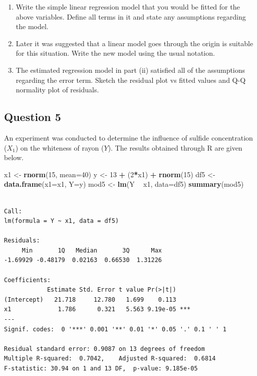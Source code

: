 \documentclass[]{article}
\newenvironment{Shaded}{\begin{snugshade}}{\end{snugshade}}
\newcommand{\DataTypeTok}[1]{\textcolor[rgb]{0.13,0.29,0.53}{#1}}
\newcommand{\DecValTok}[1]{\textcolor[rgb]{0.00,0.00,0.81}{#1}}
\newcommand{\KeywordTok}[1]{\textcolor[rgb]{0.13,0.29,0.53}{\textbf{#1}}}
\newcommand{\NormalTok}[1]{#1}
\newcommand{\OperatorTok}[1]{\textcolor[rgb]{0.81,0.36,0.00}{\textbf{#1}}}
\newcommand{\StringTok}[1]{\textcolor[rgb]{0.31,0.60,0.02}{#1}}
\begin{document}
\begin{enumerate}
\def\labelenumi{\roman{enumi})}
\item
  Write the simple linear regression model that you would be fitted for
  the above variables. Define all terms in it and state any assumptions
  regarding the model.
\item
  Later it was suggested that a linear model goes through the origin is
  suitable for this situation. Write the new model using the usual
  notation.
\item
  The estimated regression model in part (ii) satisfied all of the
  assumptions regarding the error term. Sketch the residual plot vs
  fitted values and Q-Q normality plot of residuals.
\end{enumerate}

\hypertarget{question-5}{%
\subsection{Question 5}\label{question-5}}

An experiment was conducted to determine the influence of sulfide
concentration (\(X_1\)) on the whiteness of rayon (\(Y\)). The results
obtained through R are given below.

\begin{Shaded}
\begin{Highlighting}[]
\NormalTok{x1 <-}\StringTok{ }\KeywordTok{rnorm}\NormalTok{(}\DecValTok{15}\NormalTok{, }\DataTypeTok{mean=}\DecValTok{40}\NormalTok{)}
\NormalTok{y <-}\StringTok{ }\DecValTok{13} \OperatorTok{+}\StringTok{ }\NormalTok{(}\DecValTok{2}\OperatorTok{*}\NormalTok{x1) }\OperatorTok{+}\StringTok{ }\KeywordTok{rnorm}\NormalTok{(}\DecValTok{15}\NormalTok{)}
\NormalTok{df5 <-}\StringTok{ }\KeywordTok{data.frame}\NormalTok{(}\DataTypeTok{x1=}\NormalTok{x1, }\DataTypeTok{Y=}\NormalTok{y)}
\NormalTok{mod5 <-}\StringTok{ }\KeywordTok{lm}\NormalTok{(Y }\OperatorTok{~}\StringTok{ }\NormalTok{x1, }\DataTypeTok{data=}\NormalTok{df5)}
\KeywordTok{summary}\NormalTok{(mod5)}
\end{Highlighting}
\end{Shaded}

\begin{verbatim}

Call:
lm(formula = Y ~ x1, data = df5)

Residuals:
     Min       1Q   Median       3Q      Max 
-1.69929 -0.48179  0.02163  0.66530  1.31226 

Coefficients:
            Estimate Std. Error t value Pr(>|t|)    
(Intercept)   21.718     12.780   1.699    0.113    
x1             1.786      0.321   5.563 9.19e-05 ***
---
Signif. codes:  0 '***' 0.001 '**' 0.01 '*' 0.05 '.' 0.1 ' ' 1

Residual standard error: 0.9087 on 13 degrees of freedom
Multiple R-squared:  0.7042,    Adjusted R-squared:  0.6814 
F-statistic: 30.94 on 1 and 13 DF,  p-value: 9.185e-05
\end{verbatim}
\end{document}

